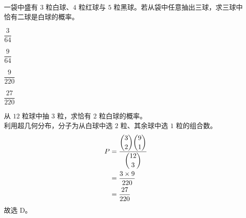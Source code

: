\documentclass[12pt,a4paper]{exam-zh}
\begin{document}


\begin{question}
    一袋中盛有 $3$ 粒白球、$4$ 粒红球与 $5$ 粒黑球。若从袋中任意抽出三球，求三球中恰有二球是白球的概率。\paren[D]
    \begin{choices}
        \item $\dfrac{3}{64}$
        \item $\dfrac{9}{64}$
        \item $\dfrac{9}{220}$
        \item $\dfrac{27}{220}$
    \end{choices}
\end{question}

\begin{solution}
    从 $12$ 粒球中抽 $3$ 粒，求恰有 $2$ 粒白球的概率。 \\
    利用超几何分布，分子为从白球中选 $2$ 粒、其余球中选 $1$ 粒的组合数。
    \begin{align*}
        P &= \frac{\dbinom{3}{2}\dbinom{9}{1}}{\dbinom{12}{3}} \\
        &= \frac{3\times9}{220} \\
        &= \frac{27}{220}
    \end{align*}
    故选 D。
\end{solution}
\end{document}
